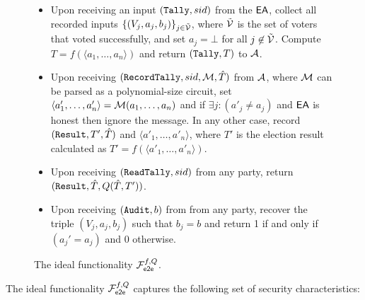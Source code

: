 \begin{figure}[t]
\begin{center}
{\begin{minipage}[h]{6in}
\begin{itemize}
\item Upon receiving an input $(\mathtt{Tally}, sid)$ from the $\mathsf{EA}$, collect
  all recorded inputs $\{(V_j, a_j, b_j)\}_{j\in \tilde{\mathcal{V}}}$,
  where $\tilde{\mathcal{V}}$ is the set of voters that voted successfully,
  and set $a_j = \bot$ for all $j\not\in \tilde{\mathcal{V}}$.  Compute
  $T =f(\langle a_{1}, \ldots, a_n \rangle )$ and return $(\mathtt{Tally}, T)$
  to $\mathcal{A}$.

\item Upon receiving $(\mathtt{RecordTally}, sid, \mathcal{M}, \hat{T})$ from
  $\mathcal{A}$, where $\mathcal{M}$ can be parsed as a polynomial-size circuit,
  set $\langle a'_{1}, \ldots, a'_n \rangle = \mathcal{M}(a_1,\ldots,a_n)$
  and if $\exists j: (a'_j \neq a_j)$ and $\mathsf{EA}$ is honest then ignore
  the message. In any other case, record $(\mathtt{Result}, T', \hat{T})$ and
  $\langle a'_{1}, \ldots, a'_n \rangle$, where $T'$ is the election
  result calculated as
  $T' = f(\langle a'_{1}, \ldots, a'_n \rangle )$.

\item Upon receiving $(\mathtt{ReadTally}, sid)$ from any party, 
return $(\mathtt{Result}, \hat{T}, Q(\hat{T},T'))$.

\item Upon receiving $(\mathtt{Audit}, b)$ from  from any party, 
recover the triple $(V_j, a_j,b_j)$ such that $b_j = b$ and return 1 if and only 
if $(a_j' = a_j)$ and 0 otherwise.
\end{itemize}
\end{minipage}
}
\end{center}
\caption{The ideal functionality $\mathcal{F}_{\mathsf{e2e}}^{f,Q}$.}
\label{fig:required_properties:fete}
\end{figure}

The ideal functionality $\mathcal{F}_{\mathsf{e2e}}^{f,Q}$ captures the following set of
security characteristics:

